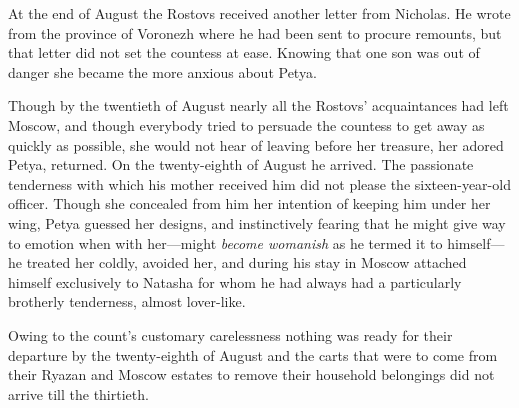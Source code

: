 At the end of August the Rostovs received another letter from
Nicholas.  He wrote from the province of Voronezh where he had
been sent to procure remounts, but that letter did not set the
countess at ease. Knowing that one son was out of danger she
became the more anxious about Petya.

Though by the twentieth of August nearly all the Rostovs'
acquaintances had left Moscow, and though everybody tried to
persuade the countess to get away as quickly as possible, she
would not hear of leaving before her treasure, her adored Petya,
returned. On the twenty-eighth of August he arrived. The
passionate tenderness with which his mother received him did not
please the sixteen-year-old officer. Though she concealed from
him her intention of keeping him under her wing, Petya guessed
her designs, and instinctively fearing that he might give way to
emotion when with her---might \emph{become womanish} as he termed
it to himself---he treated her coldly, avoided her, and during
his stay in Moscow attached himself exclusively to Natasha for
whom he had always had a particularly brotherly tenderness,
almost lover-like.

Owing to the count's customary carelessness nothing was ready for
their departure by the twenty-eighth of August and the carts that
were to come from their Ryazan and Moscow estates to remove their
household belongings did not arrive till the thirtieth.

